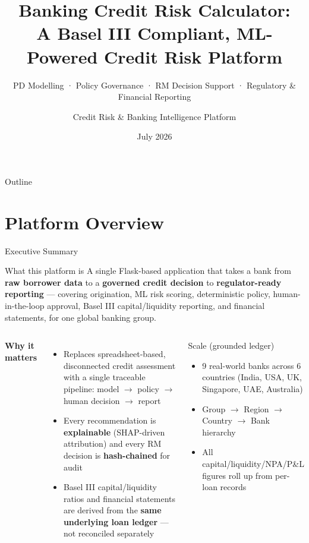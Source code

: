 \documentclass[9pt,aspectratio=169]{beamer}
\title[Banking Credit Risk Platform]{%
  Banking Credit Risk Calculator:\\[2pt]
  A Basel III Compliant, ML-Powered Credit Risk Platform}
\subtitle{PD Modelling · Policy Governance · RM Decision Support · Regulatory \& Financial Reporting}
\author[Credit Risk Engineering]{Credit Risk \& Banking Intelligence Platform}
\institute[Axis Bank]{%
  Banking Credit Risk Calculator --- Internal Solution Overview}
\date{July 2026}
\begin{document}

\begin{frame}
  \titlepage
\end{frame}

\begin{frame}{Outline}
  \tableofcontents
\end{frame}

\section{Platform Overview}

\begin{frame}{Executive Summary}
\vspace{-2pt}
\begin{block}{What this platform is}
  \footnotesize
  A single Flask-based application that takes a bank from \textbf{raw borrower data} to a
  \textbf{governed credit decision} to \textbf{regulator-ready reporting} --- covering
  origination, ML risk scoring, deterministic policy, human-in-the-loop approval,
  Basel III capital/liquidity reporting, and financial statements, for one global banking group.
\end{block}
\vspace{5pt}
\begin{columns}[T]
    \textbf{Why it matters}
    \begin{itemize}\setlength\itemsep{3pt}
      \item[\small$\bullet$] Replaces spreadsheet-based, disconnected credit assessment with a
            single traceable pipeline: model $\to$ policy $\to$ human decision $\to$ report
      \item[\small$\bullet$] Every recommendation is \textbf{explainable} (SHAP-driven attribution)
            and every RM decision is \textbf{hash-chained} for audit
      \item[\small$\bullet$] Basel III capital/liquidity ratios and financial statements are
            derived from the \textbf{same underlying loan ledger} --- not reconciled separately
    \end{itemize}
    \begin{block}{Scale (grounded ledger)}
      \footnotesize
      \begin{itemize}\setlength\itemsep{2pt}
        \item 9 real-world banks across 6 countries (India, USA, UK, Singapore, UAE, Australia)
        \item Group $\to$ Region $\to$ Country $\to$ Bank hierarchy
        \item All capital/liquidity/NPA/P\&L figures roll up from per-loan records
      \end{itemize}
    \end{block}
\end{columns}
\end{frame}
\end{document}
